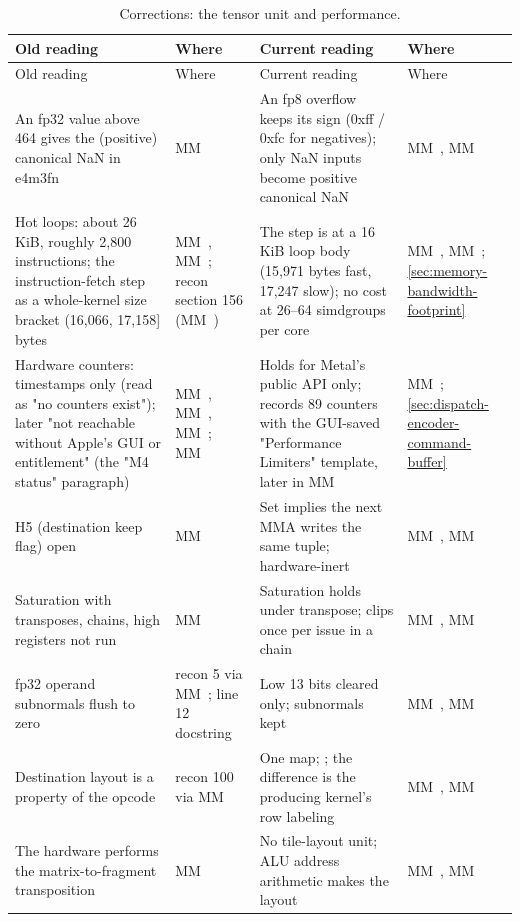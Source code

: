 \begin{xltabular}{\linewidth}{@{}>{\hsize}X>{\hsize}X>{\hsize}X>{\hsize}X@{}}
\caption{Corrections: the tensor unit and performance.}\label{tab:corr-tensor-performance}\\
\toprule
Old reading & Where & Current reading & Where \\
\midrule
\endfirsthead
{}
\toprule
Old reading & Where & Current reading & Where \\
\midrule
\endhead
An fp32 value above 464 gives the (positive) canonical NaN in e4m3fn & MM~ & An fp8 overflow keeps its sign (0xff / 0xfc for negatives); only NaN
inputs become positive canonical NaN & MM~, MM~ \\
Hot loops: about 26 KiB, roughly 2,800 instructions; the instruction-fetch step as a whole-kernel size bracket (16,066, 17,158{]}
bytes & MM~, MM~; recon section 156 (MM~) & The step is at a 16 KiB loop body (15,971 bytes fast, 17,247 slow); no cost at 26–64
simdgroups per core & MM~, MM~; \cref{sec:memory-bandwidth-footprint} \\
Hardware counters: timestamps only (read as "no counters exist"); later "not reachable without Apple's GUI or entitlement" (the "M4 status" paragraph) & MM~, MM~, MM~; MM~ & Holds for Metal's public API only;
 records 89 counters with the GUI-saved "Performance Limiters" template, later in MM~ & MM~; \cref{sec:dispatch-encoder-command-buffer} \\
H5 (destination keep flag) open & MM~ & Set implies the next MMA writes the same tuple; hardware-inert & MM~, MM~ \\
Saturation with transposes, chains, high registers not run & MM~ & Saturation holds under transpose; clips once per issue in a chain & MM~, MM~ \\
fp32 operand subnormals flush to zero & recon 5 via MM~;  line 12 docstring & Low 13 bits cleared only; subnormals kept & MM~, MM~ \\
Destination layout is a property of the opcode & recon 100 via MM~ & One map; ; the difference is the
producing kernel's row labeling & MM~, MM~ \\
The hardware performs the matrix-to-fragment transposition & MM~ & No tile-layout unit; ALU address arithmetic makes the layout & MM~, MM~ \\

\end{xltabular}
